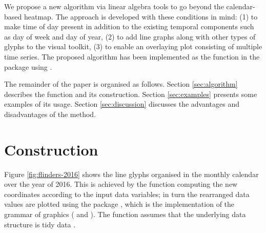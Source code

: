 \documentclass[article]{jss}
\begin{document}
We propose a new algorithm via linear algebra tools to go beyond the
calendar-based heatmap. The approach is developed with these conditions
in mind: (1) to make time of day present in addition to the existing
temporal components such as day of week and day of year, (2) to add line
graphs along with other types of glyphs to the visual toolkit, (3) to
enable an overlaying plot consisting of multiple time series. The
proposed algorithm has been implemented as the 
function in the  package \citep{R-sugrrants} using
 \citep{R-base}.

The remainder of the paper is organised as follows. Section
\ref{sec:algorithm} describes the  function and its
construction. Section \ref{sec:examples} presents some examples of its
usage. Section \ref{sec:discussion} discusses the advantages and
disadvantages of the method.

\section{Construction}\label{construction}

\label{sec:algorithm}

Figure \ref{fig:flinders-2016} shows the line glyphs organised in the
monthly calendar over the year of 2016. This is achieved by the
 function computing the new coordinates according
to the input data variables; in turn the rearranged data values are
plotted using the  package \citep{R-ggplot2}, which is the
implementation of the grammar of graphics (\citet{wilkinson2006grammar}
and \citet{wickham2010layered}). The  function
assumes that the underlying data structure is tidy data
\citep{wickham2014tidy}.
\end{document}
